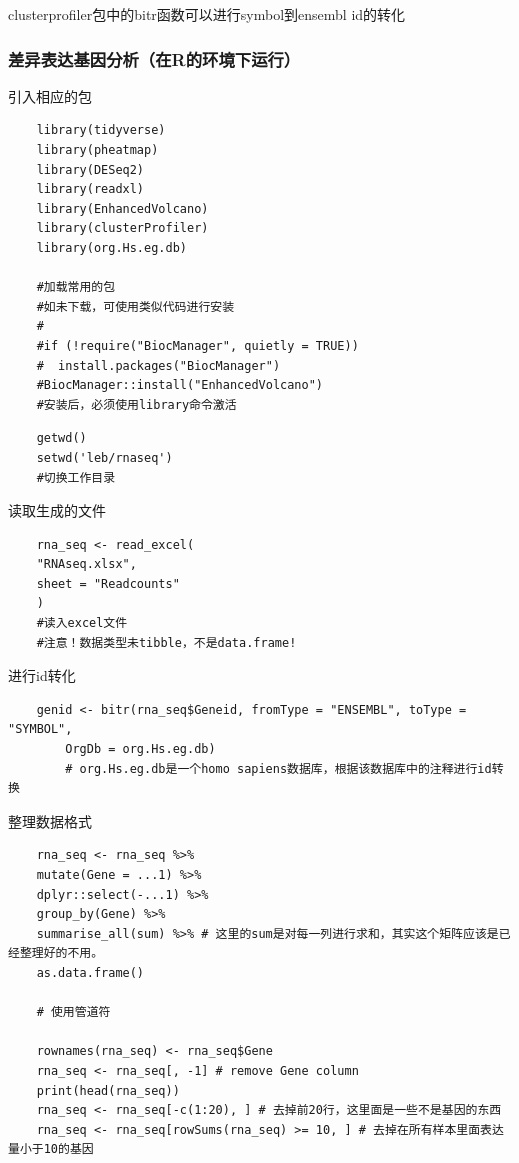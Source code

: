 clusterprofiler包中的bitr函数可以进行symbol到ensembl id的转化

\subsubsection{差异表达基因分析（在R的环境下运行）}

引入相应的包
\begin{lstlisting}
    library(tidyverse)
    library(pheatmap)
    library(DESeq2)
    library(readxl)
    library(EnhancedVolcano)
    library(clusterProfiler)
    library(org.Hs.eg.db)

    #加载常用的包
    #如未下载，可使用类似代码进行安装
    #
    #if (!require("BiocManager", quietly = TRUE))
    #  install.packages("BiocManager")
    #BiocManager::install("EnhancedVolcano")
    #安装后，必须使用library命令激活
\end{lstlisting}

\begin{lstlisting}
    getwd()
    setwd('leb/rnaseq')
    #切换工作目录
\end{lstlisting}

读取生成的文件
\begin{lstlisting}
    rna_seq <- read_excel(
    "RNAseq.xlsx",
    sheet = "Readcounts"
    )
    #读入excel文件
    #注意！数据类型未tibble，不是data.frame!
\end{lstlisting}

进行id转化
\begin{lstlisting}
    genid <- bitr(rna_seq$Geneid, fromType = "ENSEMBL", toType = "SYMBOL",
        OrgDb = org.Hs.eg.db)
        # org.Hs.eg.db是一个homo sapiens数据库，根据该数据库中的注释进行id转换

\end{lstlisting}

整理数据格式
\begin{lstlisting}
    rna_seq <- rna_seq %>%
    mutate(Gene = ...1) %>%
    dplyr::select(-...1) %>%
    group_by(Gene) %>%
    summarise_all(sum) %>% # 这里的sum是对每一列进行求和，其实这个矩阵应该是已经整理好的不用。
    as.data.frame()

    # 使用管道符

    rownames(rna_seq) <- rna_seq$Gene
    rna_seq <- rna_seq[, -1] # remove Gene column
    print(head(rna_seq))
    rna_seq <- rna_seq[-c(1:20), ] # 去掉前20行，这里面是一些不是基因的东西
    rna_seq <- rna_seq[rowSums(rna_seq) >= 10, ] # 去掉在所有样本里面表达量小于10的基因
\end{lstlisting}

